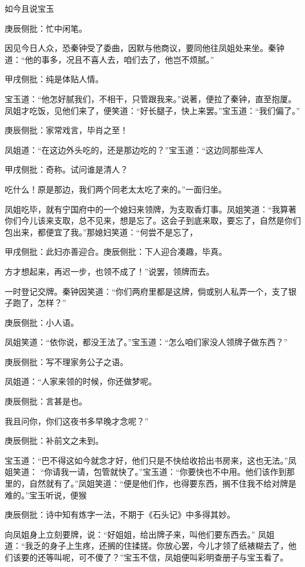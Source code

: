 \begin{parag}
    如今且说宝玉\begin{note}庚辰侧批：忙中闲笔。\end{note}因见今日人众，恐秦钟受了委曲，因默与他商议，要同他往凤姐处来坐。秦钟道：“他的事多，况且不喜人去，咱们去了，他岂不烦腻。”\begin{note}甲戌侧批：纯是体贴人情。\end{note}宝玉道：“他怎好腻我们，不相干，只管跟我来。”说著，便拉了秦钟，直至抱厦。凤姐才吃饭，见他们来了，便笑道：“好长腿子，快上来罢。”宝玉道：“我们偏了。”\begin{note}庚辰侧批：家常戏言，毕肖之至！\end{note}凤姐道：“在这边外头吃的，还是那边吃的？”宝玉道：“这边同那些浑人\begin{note}甲戌侧批：奇称。试问谁是清人？\end{note}吃什么！原是那边，我们两个同老太太吃了来的。”一面归坐。
\end{parag}


\begin{parag}
    凤姐吃毕，就有宁国府中的一个媳妇来领牌，为支取香灯事。凤姐笑道：“我算著你们今儿该来支取，总不见来，想是忘了。这会子到底来取，要忘了，自然是你们包出来，都便宜了我。”那媳妇笑道：“何尝不是忘了，\begin{note}甲戌侧批：此妇亦善迎合。庚辰侧批：下人迎合凑趣，毕真。\end{note}方才想起来，再迟一步，也领不成了！”说罢，领牌而去。
\end{parag}


\begin{parag}
    一时登记交牌。秦钟因笑道：“你们两府里都是这牌，倘或别人私弄一个，支了银子跑了，怎样？”\begin{note}庚辰侧批：小人语。\end{note}凤姐笑道：“依你说，都没王法了。”宝玉道：“怎么咱们家没人领牌子做东西？”\begin{note}庚辰侧批：写不理家务公子之语。\end{note}凤姐道：“人家来领的时候，你还做梦呢。\begin{note}庚辰侧批：言甚是也。\end{note}我且问你，你们这夜书多早晚才念呢？”\begin{note}庚辰侧批：补前文之未到。\end{note}宝玉道：“巴不得这如今就念才好，他们只是不快给收拾出书房来，这也无法。”凤姐笑道： “你请我一请，包管就快了。”宝玉道：“你要快也不中用。他们该作到那里的，自然就有了。”凤姐笑道：“便是他们作，也得要东西，搁不住我不给对牌是难的。”宝玉听说，便猴\begin{note}庚辰侧批：诗中知有炼字一法，不期于《石头记》中多得其妙。\end{note}向凤姐身上立刻要牌，说：“好姐姐，给出牌子来，叫他们要东西去。” 凤姐道：“我乏的身子上生疼，还搁的住揉搓。你放心罢，今儿才领了纸裱糊去了，他们该要的还等叫呢，可不傻了？”宝玉不信，凤姐便叫彩明查册子与宝玉看了。
\end{parag}


